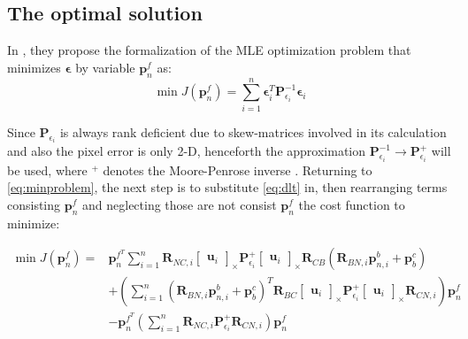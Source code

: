 \subsection{The optimal solution}

In \cite{absolute-triangulation}, they propose the formalization of the MLE optimization problem that minimizes $\boldsymbol{\epsilon}$ by variable $\mathbf{p}_n^f$ as:
\begin{equation}
    \min J(\mathbf{p}_n^f)=\sum_{i=1}^n\boldsymbol{\epsilon}_i^T\mathbf{P}_{\epsilon_i}^{-1}\boldsymbol{\epsilon}_i
    \label{eq:minproblem}
\end{equation}

Since $\mathbf{P}_{\epsilon_i}$ is always rank deficient due to skew-matrices involved in its calculation and also the pixel error is only 2-D, henceforth the approximation $\mathbf{P}_{\epsilon_i}^{-1}\rightarrow\mathbf{P}_{\epsilon_i}^{+}$ will be used, where $^+$ denotes the Moore-Penrose inverse \cite{moorepenrose}. Returning to \eqref{eq:minproblem}, the next step is to substitute \eqref{eq:dlt} in, then rearranging terms consisting $\mathbf{p}_n^f$ and neglecting those are not consist $\mathbf{p}_n^f$ the cost function to minimize:

\begin{equation}
\begin{aligned}
    \min J(\mathbf{p}_n^f) = & \mathbf{p}_n^{f^T}\sum_{i=1}^n \mathbf{R}_{NC, i}\begin{bmatrix}
        \mathbf{u}_i
    \end{bmatrix}_\times \mathbf{P}_{\epsilon_i}^{+} 
    \begin{bmatrix}
        \mathbf{u}_i
    \end{bmatrix}_\times
    \mathbf{R}_{CB}(\mathbf{R}_{BN, i}\mathbf{p}_{n, i}^b + \mathbf{p}_b^c) \\ &
     + \left(\sum_{i=1}^n(\mathbf{R}_{BN, i}\mathbf{p}_{n, i}^b + \mathbf{p}_b^c)^T\mathbf{R}_{BC}
    \begin{bmatrix}
        \mathbf{u}_i
    \end{bmatrix}_\times \mathbf{P}_{\epsilon_i}^{+}
    \begin{bmatrix}
        \mathbf{u}_i
    \end{bmatrix}_\times \mathbf{R}_{CN, i}\right) \mathbf{p}_n^f \\ &
    -\mathbf{p}_n^{f^T}\left( \sum_{i=1}^n \mathbf{R}_{NC, i}\mathbf{P}_{\epsilon_i}^{+}\mathbf{R}_{CN, i}\right)\mathbf{p}_n^f
\end{aligned}
\label{eq:costfunc}
\end{equation}

